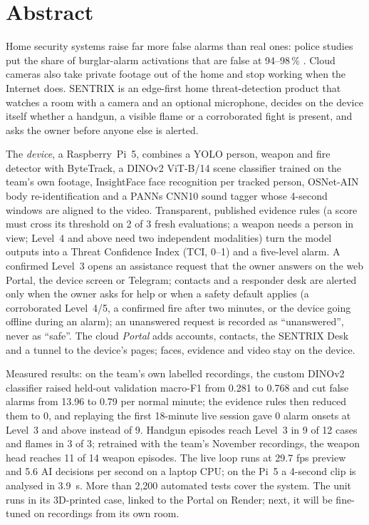 \setcounter{page}{1}
\chapter*{Abstract}
Home security systems raise far more false alarms than real ones: police studies put the share of burglar-alarm activations that are false at 94--98\,\% \cite{sampson2011false}. Cloud cameras also take private footage out of the home and stop working when the Internet does. SENTRIX is an edge-first home threat-detection product that watches a room with a camera and an optional microphone, decides on the device itself whether a handgun, a visible flame or a corroborated fight is present, and asks the owner before anyone else is alerted.

The \emph{device}, a Raspberry~Pi~5, combines a YOLO person, weapon and fire detector with ByteTrack, a DINOv2 ViT-B/14 scene classifier trained on the team's own footage, InsightFace face recognition per tracked person, OSNet-AIN body re-identification and a PANNs CNN10 sound tagger whose 4-second windows are aligned to the video. Transparent, published evidence rules (a score must cross its threshold on 2 of 3 fresh evaluations; a weapon needs a person in view; Level~4 and above need two independent modalities) turn the model outputs into a Threat Confidence Index (TCI, 0--1) and a five-level alarm. A confirmed Level~3 opens an assistance request that the owner answers on the web Portal, the device screen or Telegram; contacts and a responder desk are alerted only when the owner asks for help or when a safety default applies (a corroborated Level~4/5, a confirmed fire after two minutes, or the device going offline during an alarm); an unanswered request is recorded as ``unanswered'', never as ``safe''. The cloud \emph{Portal} adds accounts, contacts, the SENTRIX Desk and a tunnel to the device's pages; faces, evidence and video stay on the device.

Measured results: on the team's own labelled recordings, the custom DINOv2 classifier raised held-out validation macro-F1 from 0.281 to 0.768 and cut false alarms from 13.96 to 0.79 per normal minute; the evidence rules then reduced them to 0, and replaying the first 18-minute live session gave 0 alarm onsets at Level~3 and above instead of 9. Handgun episodes reach Level~3 in 9 of 12 cases and flames in 3 of 3; retrained with the team's November recordings, the weapon head reaches 11 of 14 weapon episodes. The live loop runs at 29.7 fps preview and 5.6 AI decisions per second on a laptop CPU; on the Pi~5 a 4-second clip is analysed in 3.9~s. More than 2,200 automated tests cover the system. The unit runs in its 3D-printed case, linked to the Portal on Render; next, it will be fine-tuned on recordings from its own room.

